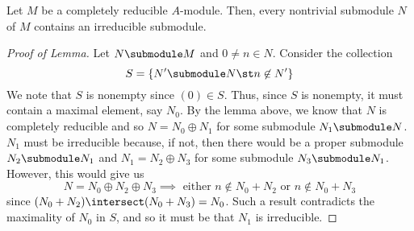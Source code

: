 \documentclass[11pt,leqno,oneside]{amsbook}
\numberwithin{thm}{section}
\begin{document}
\begin{lem}
  Let \(M\) be a completely reducible \(A\)-module. Then, every
  nontrivial submodule \(N\) of \(M\) contains an irreducible submodule.
\end{lem}
\begin{proof}[Proof of Lemma]
    Let \(N \submodule M\) and \(0 \neq n \in N\). Consider the
    collection \[
      S = \{N' \submodule N \st n \not \in N'\}
    \]
    We note that \(S\) is nonempty since \((0) \in S\). Thus, since
    \(S\) is nonempty, it must contain a maximal element, say
    \(N_0\). By the lemma above, we know that \(N\) is completely
    reducible and so \(N = N_0 \oplus N_1\) for some submodule \(N_1
    \submodule N\). \(N_1\) must be irreducible because, if not, then
    there would be a proper submodule \(N_2 \submodule N_1\) and \(N_1
    = N_2 \oplus N_3\) for some submodule \(N_3 \submodule
    N_1\). However, this would give us \[
      N = N_0 \oplus N_2 \oplus N_3 \implies \text{ either } n \not
      \in N_0 + N_2 \text{ or } n \not \in N_0 + N_3
    \]
    since \((N_0 + N_2) \intersect (N_0 + N_3) = N_0\). Such a result
    contradicts the maximality of \(N_0\) in \(S\), and so it must be
    that \(N_1\) is irreducible.
\end{proof}
\end{document}
